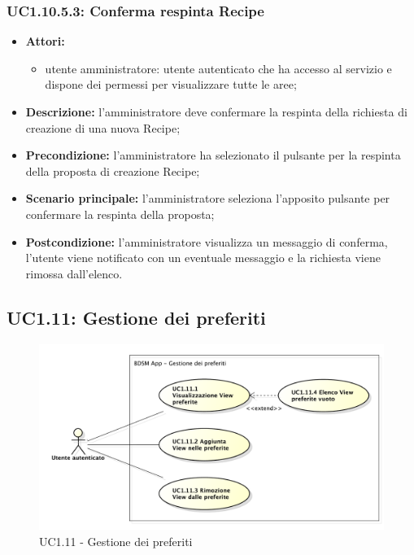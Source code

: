 \subsubsection{UC1.10.5.3: Conferma respinta Recipe}
	\begin{itemize}
		\item \textbf{Attori:}
		\begin{itemize}
			\item utente amministratore: utente autenticato che ha accesso al servizio e dispone dei permessi per visualizzare tutte le aree;
		\end{itemize}
		\item \textbf{Descrizione:} l'amministratore deve confermare la respinta della richiesta di creazione di una nuova Recipe;
		\item \textbf{Precondizione:} l'amministratore ha selezionato il pulsante per la respinta della proposta di creazione Recipe;
		\item \textbf{Scenario principale:} l'amministratore seleziona l'apposito pulsante per confermare la respinta della proposta;
		\item \textbf{Postcondizione:} l'amministratore visualizza un messaggio di conferma, l'utente viene notificato con un eventuale messaggio e la richiesta viene rimossa dall'elenco.
	\end{itemize}

\pagebreak


\subsection{UC1.11: Gestione dei preferiti}
\begin{figure}[htbp]
	\centering
	\centerline{\includegraphics[scale=0.50]{./images/UC1_11.pdf}}
	\caption{UC1.11 - Gestione dei preferiti}
\end{figure}

